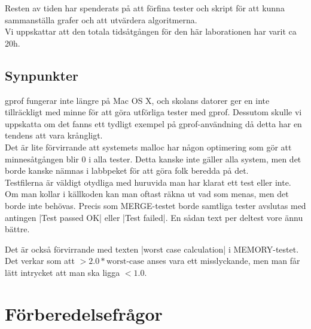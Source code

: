 \documentclass[paper=a4, fontsize=11pt]{scrartcl} %
\numberwithin{equation}{section} %
\numberwithin{figure}{section} %
\numberwithin{table}{section} %
\begin{document}
Resten av tiden har spenderats på att förfina tester och skript för att kunna
sammanställa grafer och att utvärdera algoritmerna.\\

Vi uppskattar att den totala tidsåtgången för den här laborationen har varit
ca 20h.\\


\subsection{Synpunkter}
gprof fungerar inte längre på Mac OS X, och skolans datorer ger en inte
tillräckligt med minne för att göra utförliga tester med gprof.
Dessutom skulle vi uppskatta om det fanns ett tydligt exempel på
gprof-användning då detta har en tendens att vara krångligt.\\

Det är lite förvirrande att systemets malloc har någon optimering som gör att
minnesåtgången blir 0 i alla tester. 
Detta kanske inte gäller alla system, men det borde kanske nämnas i labbpeket
för att göra folk beredda på det.\\

Testfilerna är väldigt otydliga med huruvida man har klarat ett test eller
inte. Om man kollar i källkoden kan man oftast räkna ut vad som menas, men det
borde inte behövas.
Precis som MERGE-testet borde samtliga tester avslutas med antingen
|Test passed OK| eller |Test failed|.
En sådan text per deltest vore ännu bättre. 

Det är också förvirrande med texten |worst case calculation| i MEMORY-testet.
Det verkar som att $> 2.0*\text{worst-case}$ anses vara ett misslyckande, men
man får lätt intrycket att man ska ligga $< 1.0$.


\section{Förberedelsefrågor}
\end{document}
